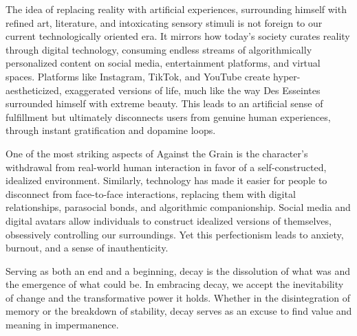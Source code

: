 The idea of replacing reality with artificial experiences, surrounding himself with refined art, literature, and intoxicating sensory stimuli is not foreign to our current technologically oriented era. It mirrors how today's society curates reality through digital technology, consuming endless streams of algorithmically personalized content on social media, entertainment platforms, and virtual spaces. Platforms like Instagram, TikTok, and YouTube create hyper-aestheticized, exaggerated versions of life, much like the way Des Esseintes surrounded himself with extreme beauty. This leads to an artificial sense of fulfillment but ultimately disconnects users from genuine human experiences, through instant gratification and dopamine loops.

One of the most striking aspects of Against the Grain is the character's withdrawal from real-world human interaction in favor of a self-constructed, idealized environment. Similarly, technology has made it easier for people to disconnect from face-to-face interactions, replacing them with digital relationships, parasocial bonds, and algorithmic companionship. Social media and digital avatars allow individuals to construct idealized versions of themselves, obsessively controlling our surroundings. Yet this perfectionism leads to anxiety, burnout, and a sense of inauthenticity.

Serving as both an end and a beginning, decay is the dissolution of what was and the emergence of what could be. In embracing decay, we accept the inevitability of change and the transformative power it holds. Whether in the disintegration of memory or the breakdown of stability, decay serves as an excuse to find value and meaning in impermanence.

